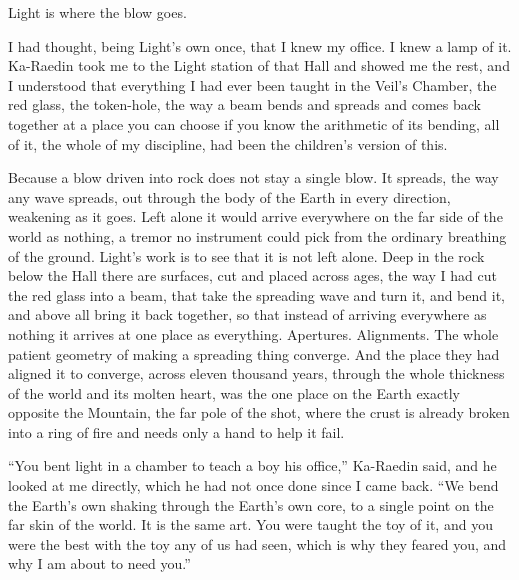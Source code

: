 \ornament

Light is where the blow goes.\par

I had thought, being Light's own once, that I knew my office. I knew a lamp of it. Ka-Raedin took me to the Light station of that Hall and showed me the rest, and I understood that everything I had ever been taught in the Veil's Chamber, the red glass, the token-hole, the way a beam bends and spreads and comes back together at a place you can choose if you know the arithmetic of its bending, all of it, the whole of my discipline, had been the children's version of this.\par

Because a blow driven into rock does not stay a single blow. It spreads, the way any wave spreads, out through the body of the Earth in every direction, weakening as it goes. Left alone it would arrive everywhere on the far side of the world as nothing, a tremor no instrument could pick from the ordinary breathing of the ground. Light's work is to see that it is not left alone. Deep in the rock below the Hall there are surfaces, cut and placed across ages, the way I had cut the red glass into a beam, that take the spreading wave and turn it, and bend it, and above all bring it back together, so that instead of arriving everywhere as nothing it arrives at one place as everything. Apertures. Alignments. The whole patient geometry of making a spreading thing converge. And the place they had aligned it to converge, across eleven thousand years, through the whole thickness of the world and its molten heart, was the one place on the Earth exactly opposite the Mountain, the far pole of the shot, where the crust is already broken into a ring of fire and needs only a hand to help it fail.\par

``You bent light in a chamber to teach a boy his office,'' Ka-Raedin said, and he looked at me directly, which he had not once done since I came back. ``We bend the Earth's own shaking through the Earth's own core, to a single point on the far skin of the world. It is the same art. You were taught the toy of it, and you were the best with the toy any of us had seen, which is why they feared you, and why I am about to need you.''\par

